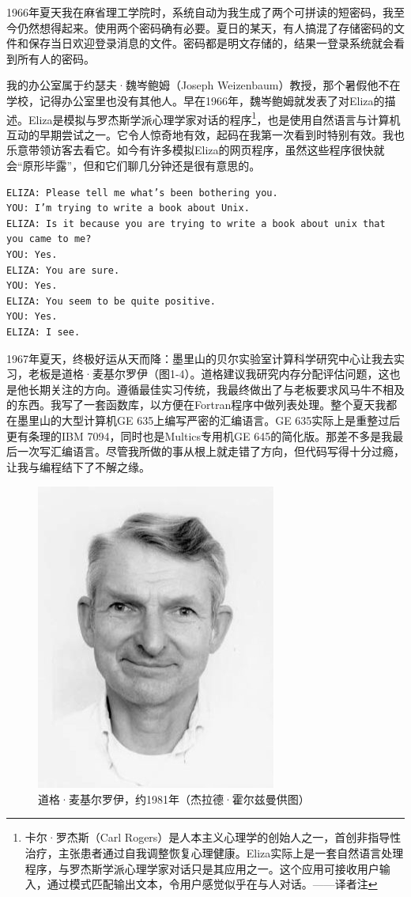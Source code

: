 \documentclass[a4paper,12pt,UTF8,twoside]{ctexbook}
\begin{document}
1966年夏天我在麻省理工学院时，系统自动为我生成了两个可拼读的短密码，我至今仍然想得起来。使用两个密码确有必要。夏日的某天，有人搞混了存储密码的文件和保存当日欢迎登录消息的文件。密码都是明文存储的，结果一登录系统就会看到所有人的密码。

我的办公室属于约瑟夫·魏岑鲍姆（Joseph Weizenbaum）教授，那个暑假他不在学校，记得办公室里也没有其他人。早在1966年，魏岑鲍姆就发表了对Eliza的描述。Eliza是模拟与罗杰斯学派心理学家对话的程序\footnote{卡尔·罗杰斯（Carl Rogers）是人本主义心理学的创始人之一，首创非指导性治疗，主张患者通过自我调整恢复心理健康。Eliza实际上是一套自然语言处理程序，与罗杰斯学派心理学家对话只是其应用之一。这个应用可接收用户输入，通过模式匹配输出文本，令用户感觉似乎在与人对话。——译者注}，也是使用自然语言与计算机互动的早期尝试之一。它令人惊奇地有效，起码在我第一次看到时特别有效。我也乐意带领访客去看它。如今有许多模拟Eliza的网页程序，虽然这些程序很快就会“原形毕露”，但和它们聊几分钟还是很有意思的。

\begin{lstlisting}
ELIZA: Please tell me what’s been bothering you.
YOU: I’m trying to write a book about Unix.
ELIZA: Is it because you are trying to write a book about unix that you came to me?
YOU: Yes.
ELIZA: You are sure.
YOU: Yes.
ELIZA: You seem to be quite positive.
YOU: Yes.
ELIZA: I see.
\end{lstlisting}

1967年夏天，终极好运从天而降：墨里山的贝尔实验室计算科学研究中心让我去实习，老板是道格·麦基尔罗伊（图1-4）。道格建议我研究内存分配评估问题，这也是他长期关注的方向。遵循最佳实习传统，我最终做出了与老板要求风马牛不相及的东西。我写了一套函数库，以方便在Fortran程序中做列表处理。整个夏天我都在墨里山的大型计算机GE 635上编写严密的汇编语言。GE 635实际上是重整过后更有条理的IBM 7094，同时也是Multics专用机GE 645的简化版。那差不多是我最后一次写汇编语言。尽管我所做的事从根上就走错了方向，但代码写得十分过瘾，让我与编程结下了不解之缘。

\begin{figure}[htbp]
	\centering
	\includegraphics[width=0.7\linewidth]{4}
	\caption{道格·麦基尔罗伊，约1981年（杰拉德·霍尔兹曼供图）}
	\label{fig:1}
\end{figure}
\end{document}
